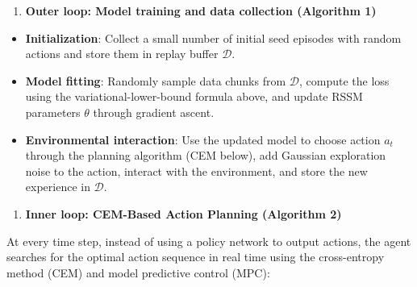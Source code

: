 \begin{enumerate}
\def\labelenumi{\arabic{enumi}.}
\tightlist
\item
  \textbf{Outer loop: Model training and data collection (Algorithm 1)}
\end{enumerate}

\begin{itemize}
\tightlist
\item
  \textbf{Initialization}: Collect a small number of initial seed episodes with random actions and store them in replay buffer \(\mathcal{D}\).
\item
  \textbf{Model fitting}: Randomly sample data chunks from \(\mathcal{D}\), compute the loss using the variational-lower-bound formula above, and update RSSM parameters \(\theta\) through gradient ascent.
\item
  \textbf{Environmental interaction}: Use the updated model to choose action \(a_t\) through the planning algorithm (CEM below), add Gaussian exploration noise to the action, interact with the environment, and store the new experience in \(\mathcal{D}\).
\end{itemize}

\begin{enumerate}
\def\labelenumi{\arabic{enumi}.}
\setcounter{enumi}{1}
\tightlist
\item
  \textbf{Inner loop: CEM-Based Action Planning (Algorithm 2)}
\end{enumerate}

At every time step, instead of using a policy network to output actions, the agent searches for the optimal action sequence in real time using the cross-entropy method (CEM) and model predictive control (MPC):

